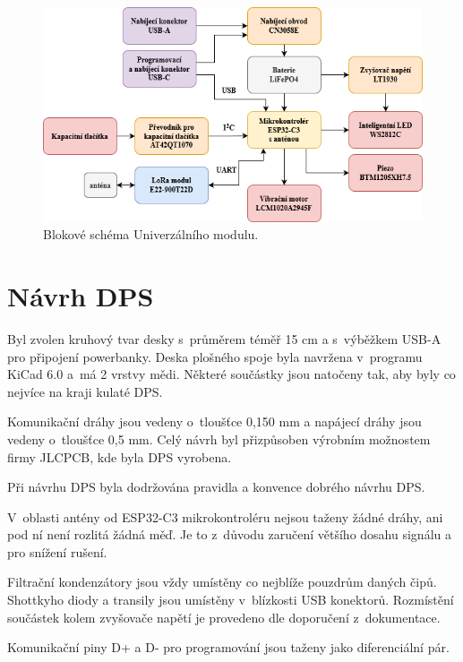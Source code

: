 \begin{figure}[!h]
  \begin{center}
    \includegraphics[scale=0.65]{obrazky/vysledne_blokove_schema.png}
  \end{center}
  \caption[Blokové schéma Univerzálního modulu]{Blokové schéma Univerzálního modulu.}
\end{figure}


\chapter{Návrh DPS}
Byl zvolen kruhový tvar desky s~průměrem téměř 15 cm a s~výběžkem USB-A pro připojení powerbanky. Deska plošného spoje byla navržena v~programu KiCad 6.0 a~má 2 vrstvy mědi. 
Některé součástky jsou natočeny tak, aby byly co nejvíce na kraji kulaté DPS.

Komunikační dráhy jsou vedeny o~tloušťce 0,150 mm a napájecí dráhy jsou vedeny o~tloušťce 0,5 mm. Celý návrh byl přizpůsoben výrobním možnostem firmy JLCPCB, kde byla DPS vyrobena.

Při návrhu DPS byla dodržována pravidla a konvence dobrého návrhu DPS.

V~oblasti antény od ESP32-C3 mikrokontroléru nejsou taženy žádné dráhy, ani pod ní není rozlitá žádná měď. Je to z~důvodu zaručení většího dosahu signálu a pro snížení rušení. 

Filtrační kondenzátory jsou vždy umístěny co nejblíže pouzdrům daných čipů. Shottkyho diody a transily jsou umístěny v~blízkosti USB konektorů. Rozmístění součástek kolem zvyšovače napětí 
je provedeno dle doporučení z~dokumentace. 

Komunikační piny D+ a D- pro programování jsou taženy jako diferenciální pár.

